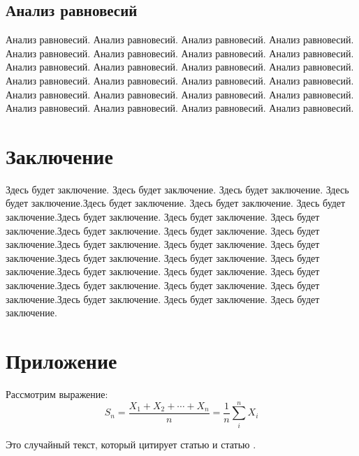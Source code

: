 \documentclass[12pt]{article}
\begin{document}
\subsection{Анализ равновесий}

Анализ равновесий. Анализ равновесий. Анализ равновесий. Анализ равновесий. Анализ равновесий. Анализ равновесий. Анализ равновесий. Анализ равновесий. Анализ равновесий. Анализ равновесий. Анализ равновесий. Анализ равновесий. Анализ равновесий. Анализ равновесий. Анализ равновесий. Анализ равновесий. Анализ равновесий. Анализ равновесий. Анализ равновесий. Анализ равновесий. Анализ равновесий. Анализ равновесий. Анализ равновесий. Анализ равновесий.



\section{Заключение}

Здесь будет заключение. Здесь будет заключение. Здесь будет заключение. Здесь будет заключение.Здесь будет заключение. Здесь будет заключение. Здесь будет заключение.Здесь будет заключение. Здесь будет заключение. Здесь будет заключение.Здесь будет заключение. Здесь будет заключение. Здесь будет заключение.Здесь будет заключение. Здесь будет заключение. Здесь будет заключение.Здесь будет заключение. Здесь будет заключение. Здесь будет заключение.Здесь будет заключение. Здесь будет заключение. Здесь будет заключение.Здесь будет заключение. Здесь будет заключение. Здесь будет заключение.Здесь будет заключение. Здесь будет заключение. Здесь будет заключение.



\newpage
\section{Приложение}

Рассмотрим выражение:
$$S_n = \frac{X_1 + X_2 + \cdots + X_n}{n}
      = \frac{1}{n}\sum_{i}^{n} X_i$$


Это случайный текст, который цитирует статью \citet{Tir} и статью \citet{Ak}.

\newpage
{}

\end{document}
